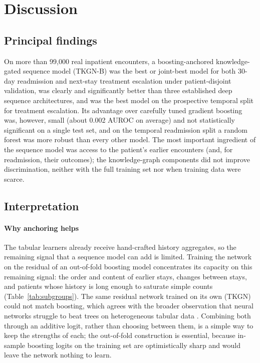 \section{Discussion}
\label{sec:discussion}

\subsection{Principal findings}
On more than 99{,}000 real inpatient encounters, a boosting-anchored
knowledge-gated sequence model (TKGN-B) was the best or joint-best model for
both 30-day readmission and next-stay treatment escalation under
patient-disjoint validation, was clearly and significantly better than
three established deep sequence architectures, and was the best model on the
prospective temporal split for treatment escalation. Its advantage over
carefully tuned gradient boosting was, however, small (about 0.002 AUROC on
average) and not statistically significant on a single test set, and on the
temporal readmission split a random forest was more robust than every other
model. The most important ingredient of the sequence model was access to
the patient's earlier encounters (and, for readmission, their outcomes); the
knowledge-graph components did not improve discrimination, neither with the
full training set nor when training data were scarce.

\subsection{Interpretation}
\paragraph{Why anchoring helps}
The tabular learners already receive hand-crafted history aggregates, so
the remaining signal that a sequence model can add is limited. Training the
network on the residual of an out-of-fold boosting model concentrates its
capacity on this remaining signal: the order and content of earlier stays,
changes between stays, and patients whose history is long enough to
saturate simple counts (Table~\ref{tab:subgroups}). The same residual
network trained on its own (TKGN) could not match boosting, which agrees
with the broader observation that neural networks struggle to beat trees on
heterogeneous tabular data \citep{grinsztajn2022}. Combining both
through an additive logit, rather than choosing between them, is a simple
way to keep the strengths of each; the out-of-fold construction is
essential, because in-sample boosting logits on the training set are
optimistically sharp and would leave the network nothing to learn.

